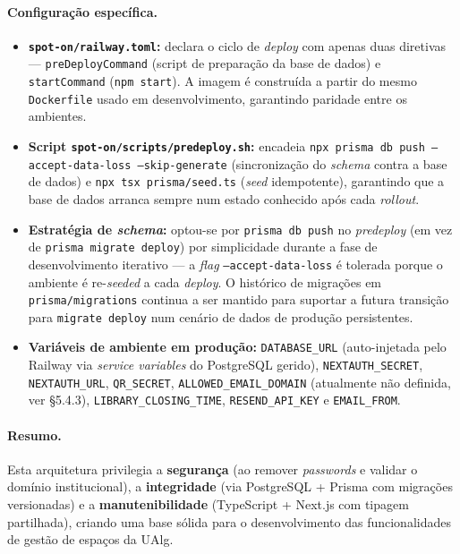 \documentclass[11pt,a4paper]{article}
\begin{document}
\paragraph{Configuração específica.}
\begin{itemize}[leftmargin=*]
    \item \textbf{\texttt{spot-on/railway.toml}:} declara o ciclo de \emph{deploy}
          com apenas duas diretivas --- \texttt{preDeployCommand} (script de
          preparação da base de dados) e \texttt{startCommand}
          (\texttt{npm start}). A imagem é construída a partir do mesmo
          \texttt{Dockerfile} usado em desenvolvimento, garantindo paridade
          entre os ambientes.
    \item \textbf{Script \texttt{spot-on/scripts/predeploy.sh}:} encadeia
          \texttt{npx prisma db push --accept-data-loss --skip-generate}
          (sincronização do \emph{schema} contra a base de dados) e
          \texttt{npx tsx prisma/seed.ts} (\emph{seed} idempotente),
          garantindo que a base de dados arranca sempre num estado conhecido
          após cada \emph{rollout}.
    \item \textbf{Estratégia de \emph{schema}:} optou-se por
          \texttt{prisma db push} no \emph{predeploy} (em vez de
          \texttt{prisma migrate deploy}) por simplicidade durante a fase de
          desenvolvimento iterativo --- a \emph{flag}
          \texttt{--accept-data-loss} é tolerada porque o ambiente é
          re-\emph{seeded} a cada \emph{deploy}. O histórico de migrações em
          \texttt{prisma/migrations} continua a ser mantido para suportar a
          futura transição para \texttt{migrate deploy} num cenário de dados
          de produção persistentes.
    \item \textbf{Variáveis de ambiente em produção:}
          \texttt{DATABASE\_URL} (auto-injetada pelo Railway via \emph{service
              variables} do PostgreSQL gerido), \texttt{NEXTAUTH\_SECRET},
          \texttt{NEXTAUTH\_URL}, \texttt{QR\_SECRET},
          \texttt{ALLOWED\_EMAIL\_DOMAIN} (atualmente não definida, ver
          \S5.4.3), \texttt{LIBRARY\_CLOSING\_TIME},
          \texttt{RESEND\_API\_KEY} e \texttt{EMAIL\_FROM}.
\end{itemize}

\paragraph{Resumo.} Esta arquitetura privilegia a \textbf{segurança} (ao
remover \emph{passwords} e validar o domínio institucional), a
\textbf{integridade} (via PostgreSQL + Prisma com migrações versionadas) e a
\textbf{manutenibilidade} (TypeScript + Next.js com tipagem partilhada),
criando uma base sólida para o desenvolvimento das funcionalidades de gestão
de espaços da UAlg.
\end{document}
